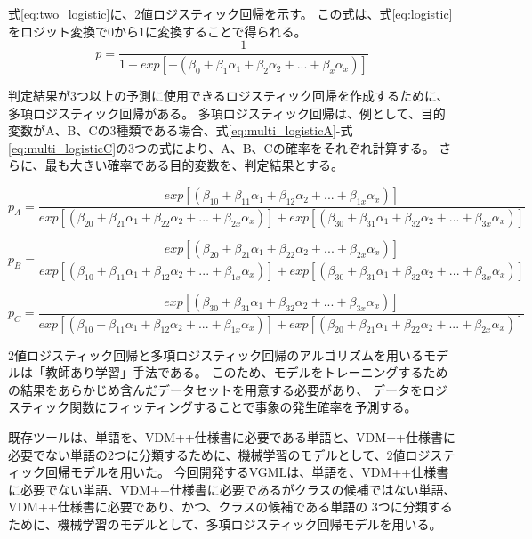 式\ref{eq:two_logistic}に、2値ロジスティック回帰を示す。
この式は、式\ref{eq:logistic}をロジット変換で0から1に変換することで得られる。
\begin{equation}\label{eq:two_logistic}
    p = \frac{1}{1+exp[- (\beta_{0}+ \beta_{1}\alpha_{1}+\beta_{2}\alpha_{2}+...+\beta_{x}\alpha_{x})]}
\end{equation}

判定結果が3つ以上の予測に使用できるロジスティック回帰を作成するために、多項ロジスティック回帰がある\cite{multinomial_logistic}。
多項ロジスティック回帰は、例として、目的変数がA、B、Cの3種類である場合、式\ref{eq:multi_logisticA}-式\ref{eq:multi_logisticC}の3つの式により、A、B、Cの確率をそれぞれ計算する。
さらに、最も大きい確率である目的変数を、判定結果とする。

\begin{equation}\label{eq:multi_logisticA}
    p_{A} = \frac{exp[(\beta_{10}+ \beta_{11}\alpha_{1}+\beta_{12}\alpha_{2}+...+\beta_{1x}\alpha_{x})]}{exp[(\beta_{20}+ \beta_{21}\alpha_{1}+\beta_{22}\alpha_{2}+...+\beta_{2x}\alpha_{x})]+exp[(\beta_{30}+ \beta_{31}\alpha_{1}+\beta_{32}\alpha_{2}+...+\beta_{3x}\alpha_{x})]}
\end{equation}

\begin{equation}\label{eq:multi_logisticB}
    p_{B} = \frac{exp[(\beta_{20}+ \beta_{21}\alpha_{1}+\beta_{22}\alpha_{2}+...+\beta_{2x}\alpha_{x})]}{exp[(\beta_{10}+ \beta_{11}\alpha_{1}+\beta_{12}\alpha_{2}+...+\beta_{1x}\alpha_{x})]+exp[(\beta_{30}+ \beta_{31}\alpha_{1}+\beta_{32}\alpha_{2}+...+\beta_{3x}\alpha_{x})]}
\end{equation}

\begin{equation}\label{eq:multi_logisticC}
    p_{C} = \frac{exp[(\beta_{30}+ \beta_{31}\alpha_{1}+\beta_{32}\alpha_{2}+...+\beta_{3x}\alpha_{x})]}{exp[(\beta_{10}+ \beta_{11}\alpha_{1}+\beta_{12}\alpha_{2}+...+\beta_{1x}\alpha_{x})]+exp[(\beta_{20}+ \beta_{21}\alpha_{1}+\beta_{22}\alpha_{2}+...+\beta_{2x}\alpha_{x})]}
\end{equation}

2値ロジスティック回帰と多項ロジスティック回帰のアルゴリズムを用いるモデルは「教師あり学習」手法である。
このため、モデルをトレーニングするための結果をあらかじめ含んだデータセットを用意する必要があり、
データをロジスティック関数にフィッティングすることで事象の発生確率を予測する。

既存ツールは、単語を、VDM++仕様書に必要である単語と、VDM++仕様書に必要でない単語の2つに分類するために、機械学習のモデルとして、2値ロジスティック回帰モデルを用いた。
今回開発するVGMLは、単語を、VDM++仕様書に必要でない単語、VDM++仕様書に必要であるがクラスの候補ではない単語、VDM++仕様書に必要であり、かつ、クラスの候補である単語の
3つに分類するために、機械学習のモデルとして、多項ロジスティック回帰モデルを用いる。